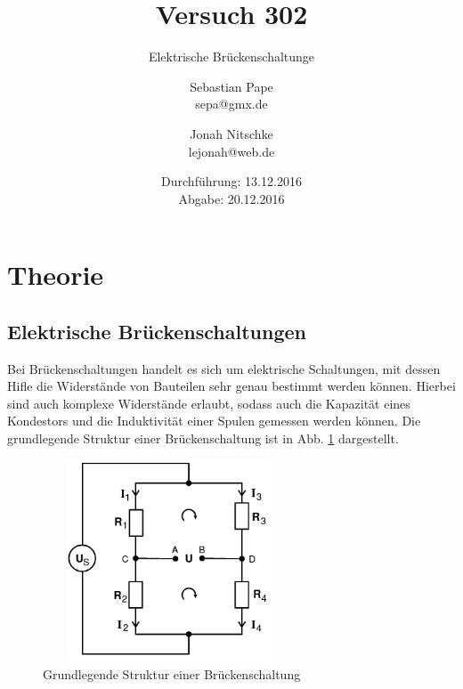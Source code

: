 

\title{Versuch 302}
\subtitle{Elektrische Brückenschaltunge}
\author{Sebastian Pape\\
        sepa@gmx.de \and
        Jonah Nitschke\\
        lejonah@web.de}
\date{Durchführung: 13.12.2016\\
      Abgabe: 20.12.2016}


\maketitle
\setcounter{page}{1}
\section{Theorie}

\subsection{Elektrische Brückenschaltungen}

Bei Brückenschaltungen handelt es sich um elektrische Schaltungen, mit dessen
Hifle die Widerstände von Bauteilen sehr genau bestimmt werden können.
Hierbei sind auch komplexe Widerstände erlaubt, sodass auch die Kapazität eines
Kondestors und die Induktivität einer Spulen gemessen werden können.
Die grundlegende Struktur einer Brückenschaltung ist in Abb. \ref{fig:Brückenschaltung}
dargestellt.

\begin{figure}
  \includegraphics[width=7.50cm, height=6cm]{V302_Brückenschaltung.png}
  \caption{Grundlegende Struktur einer Brückenschaltung\cite{anleitung01}}
  \label{fig:Brückenschaltung}
\end{figure}

